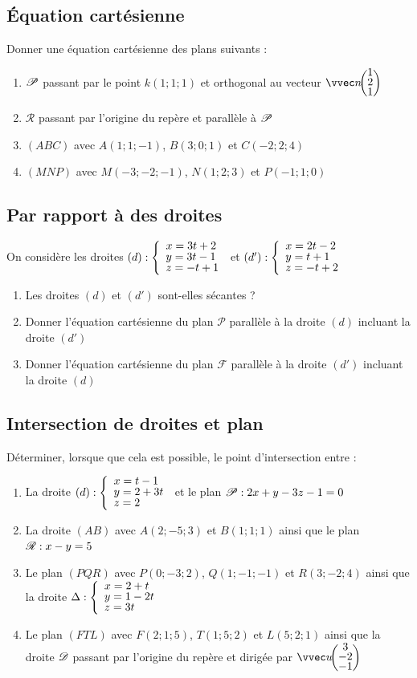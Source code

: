 \documentclass[oneside,12pt]{book}          %
\begin{document}
\subsection{Équation cartésienne}
Donner une équation cartésienne des plans suivants :
\begin{enumerate}
	\item ${\mathscr{P}}$ passant par le point $k(1;1;1)$ et orthogonal au vecteur $\vcoord{n}{1\\2\\1}$
	\item $\mathcal{R}$ passant par l'origine du repère et parallèle à ${\mathscr{P}}$
    \item $(ABC)$ avec $A(1;1;-1)$, $B(3;0;1)$ et $C(-2;2;4)$
    \item $(MNP)$ avec $M(-3;-2;-1)$, $N(1;2;3)$ et $P(-1;1;0)$
\end{enumerate}



\subsection{Par rapport à des droites}
On considère les droites $(d):\accol{x=3t+2\\y=3t-1\\z=-t+1}$ et $(d'):\accol{x=2t-2\\y=t+1\\z=-t+2}$
\begin{enumerate}
    \item Les droites $(d)$ et $(d')$ sont-elles sécantes ?
    \item Donner l'équation cartésienne du plan $\mathscr{P}$ parallèle à la droite $(d)$ incluant la droite $(d')$
    \item Donner l'équation cartésienne du plan $\mathscr{F}$ parallèle à la droite $(d')$ incluant la droite $(d)$
\end{enumerate}



\subsection{Intersection de droites et plan}
Déterminer, lorsque que cela est possible, le point d'intersection entre :
\begin{enumerate}
	\item La droite $(d):\accol{x=t-1\\y=2+3t\\z=2}$ et le plan ${\mathscr{P}} : 2x+y-3z-1=0$
	\item La droite $(AB)$ avec $A(2;-5;3)$ et $B(1;1;1)$ ainsi que le plan ${\mathscr{R}} :x-y=5$
	\item Le plan $(PQR)$ avec $P(0;-3;2)$, $Q(1;-1;-1)$ et $R(3;-2;4)$ ainsi que la droite $\Delta :\accol{x=2+t\\y=1-2t\\z=3t}$
	\item Le plan $(FTL)$ avec $F(2;1;5)$, $T(1;5;2)$ et $L(5;2;1)$ ainsi que la droite ${\mathscr{D}}$ passant par l'origine du repère et dirigée par $\vcoord{u}{3\\-2\\-1}$
\end{enumerate}
\end{document}
